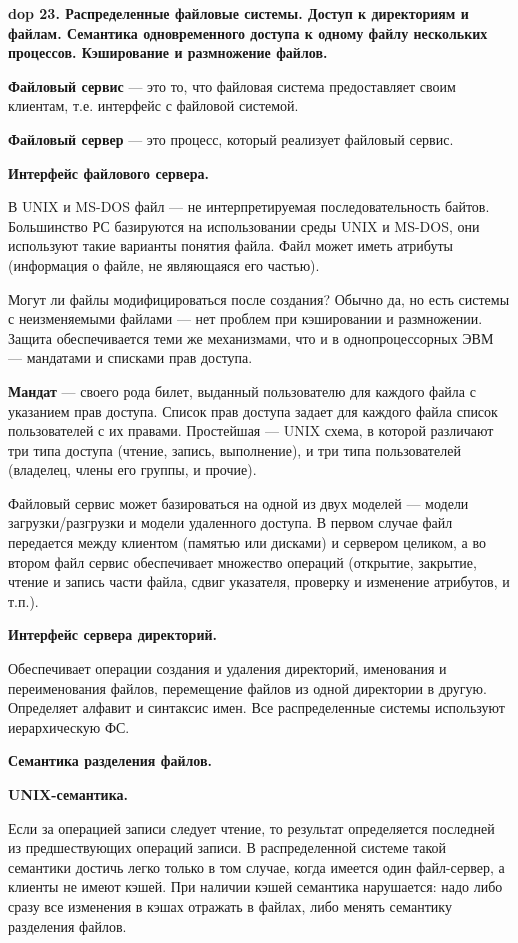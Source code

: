 \textbf{\LARGE dop 23. Распределенные файловые системы. Доступ к директориям и файлам. Семантика одновременного доступа к одному файлу нескольких процессов. Кэширование и размножение файлов.}

\textbf{Файловый сервис} --- это то, что файловая система предоставляет своим клиентам, т.е. интерфейс с файловой системой.

\textbf{Файловый сервер} --- это процесс, который реализует файловый сервис.

\textbf{Интерфейс файлового сервера.}

В UNIX и MS-DOS файл --- не интерпретируемая последовательность байтов.
Большинство РС базируются на использовании среды UNIX и MS-DOS, они используют такие варианты понятия файла. 
Файл может иметь атрибуты (информация о файле, не являющаяся его частью).

Могут ли файлы модифицироваться после создания? Обычно да, но есть системы с неизменяемыми файлами --- нет проблем при кэшировании и размножении. 
Защита обеспечивается теми же механизмами, что и в однопроцессорных ЭВМ --- мандатами и списками прав доступа. 

\textbf{Мандат} --- своего рода билет, выданный пользователю для каждого файла с указанием прав доступа. 
Список прав доступа задает для каждого файла список пользователей с их правами. 
Простейшая --- UNIX схема, в которой различают три типа доступа (чтение, запись, выполнение), и три типа пользователей (владелец, члены его группы, и прочие).

Файловый сервис может базироваться на одной из двух моделей --- модели загрузки/разгрузки и модели удаленного доступа. 
В первом случае файл передается между клиентом (памятью или дисками) и сервером целиком, а во втором файл сервис обеспечивает множество операций (открытие, закрытие, чтение и запись части файла, сдвиг указателя, проверку и изменение атрибутов, и т.п.).

\textbf{Интерфейс сервера директорий.}

Обеспечивает операции создания и удаления директорий, именования и переименования файлов, перемещение файлов из одной директории в другую. 
Определяет алфавит и синтаксис имен. 
Все распределенные системы используют иерархическую ФС.

\textbf{Семантика разделения файлов.}

\textbf{UNIX-семантика.}

Если за операцией записи следует чтение, то результат определяется последней из предшествующих операций записи. 
В распределенной системе такой семантики достичь легко только в том случае, когда имеется один файл-сервер, а клиенты не имеют кэшей. 
При наличии кэшей семантика нарушается: надо либо сразу все изменения в кэшах отражать в файлах, либо менять семантику разделения файлов. 


